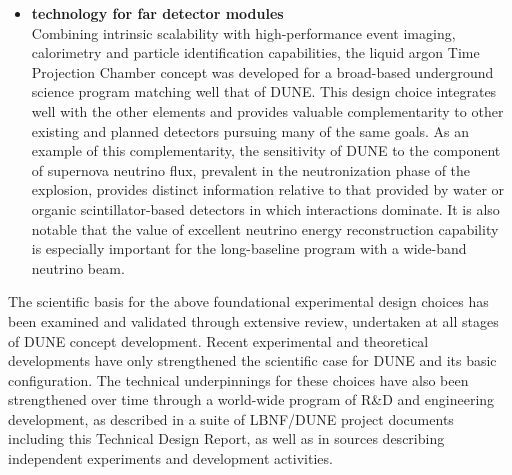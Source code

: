 \begin{itemize}
  \item {\bf \lartpc technology for far detector modules}\\
    Combining intrinsic scalability with high-performance event 
    imaging, calorimetry and particle identification capabilities, 
    the liquid argon Time Projection Chamber concept was developed 
    for a broad-based underground science program matching well 
    that of DUNE.  This design choice integrates well with the
    other elements and provides valuable complementarity to other 
    existing and planned detectors pursuing many
    of the same goals.  As an example of this complementarity,
    the sensitivity of DUNE to the \nue component of supernova 
    neutrino flux, prevalent in the neutronization phase of the 
    explosion, provides distinct information relative to that 
    provided by water or organic scintillator-based detectors in 
    which \anue interactions dominate.  It is also notable that 
    the value of excellent neutrino energy reconstruction capability
    is especially important for the long-baseline program with a 
    wide-band neutrino beam.
\end{itemize}

The scientific basis for the above foundational experimental
design choices has been examined and validated through extensive
review, undertaken at all stages of DUNE concept development.
Recent experimental and theoretical developments have only
strengthened the scientific case for DUNE and its
basic configuration.  The technical underpinnings for
these choices have also been strengthened over time through a world-wide
program of R\&D and engineering development, as described in a suite
of LBNF/DUNE project documents including this Technical Design Report, as
well as in sources describing independent experiments and development
activities.

%

%


